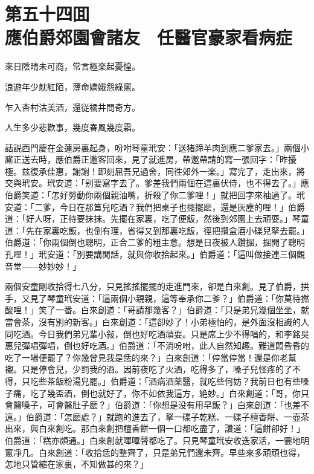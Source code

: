 
\chapter*{第五十四囬　\\應伯爵郊園會諸友　任醫官豪家看病症}


\begin{myquote}
來日陰晴未可商，常言極楽起憂惶。

浪遊年少躭紅陌，薄命嬌娥怨綠窻。

乍入杏村沽美酒，還従橘井問奇方。

人生多少悲歡事，幾度春風幾度霜。
\end{myquote}

話説西門慶在金蓮房裏起身，吩咐琴童玳安：「送猪蹄羊肉到應二爹家去。」兩個小廝正送去時，應伯爵正邀客回來，見了就進房，帶邀帶請的寫一張回字：「昨擾極。兹復承佳惠，謝謝！即刻屈吾兄過舍，同徃郊外一楽。」寫完了，走出來，將交與玳安。玳安道：「别要寫字去了。爹差我們兩個在這裏伏侍，也不得去了。」應伯爵笑道：「怎好勞動你兩個親油嘴，折殺了你二爹哩！」就把回字來袖過了。玳安道：「二爹，今日在那笪兒吃酒？我們把桌子也擺擺麽，還是灰塵的哩！」伯爵道：「好人呀，正待要抹抹。先擺在家裏，吃了便飯，然後到郊園上去頑耍。」琴童道：「先在家裏吃飯，也倒有理，省得又到那裏吃飯，徑把攢盒酒小碟兒拏去罷。」伯爵道：「你兩個倒也聰明，正合二爹的粗主意。想是日夜被人鑽掘，掘開了聰明孔哩！」玳安道：「別要講閒話，就與你收拾起來。」伯爵道：「這叫做接連三個觀音堂——妙妙妙！」

兩個安童剛收拾得七八分，只見搖搖擺擺的走進門來，卻是白來創。見了伯爵，拱手，又見了琴童玳安道：「這兩個小親親，這等奉承你二爹？」伯爵道：「你莫待撚酸哩！」笑了一番。白來創道：「哥請那幾客？」伯爵道：「只是弟兄幾個坐坐，就當會茶，沒有別的新客。」白來創道：「這卻妙了！小弟極怕的，是外面沒相識的人同吃酒。今日我們弟兄輩小敍，倒也好吃酒頑耍。只是席上少不得唱的，和李銘吳惠兒彈唱彈唱，倒也好吃酒。」伯爵道：「不消吩咐，此人自然知趣。難道悶昏昏的吃了一場便罷了？你幾曾見我是恁的來？」白來創道：「停當停當！還是你老幫襯。只是停會兒，少罰我的酒。因前夜吃了火酒，吃得多了，嗓子兒怪疼的了不得，只吃些茶飯粉湯兒罷。」伯爵道：「酒病酒薬醫，就吃些何妨？我前日也有些嗓子痛，吃了幾盃酒，倒也就好了，你不如依我這方，絶妙。」白來創道：「哥，你只會醫嗓子，可會醫肚子麽？」伯爵道：「你想是没有用早飯？」白來創道：「也差不遠。」伯爵道：「怎麽處？」就跑的進去了，拏一碟子乾糕、一碟子檀香餅、一壺茶出來，與白來創吃。那白來創把檀香餅一個一口都吃盡了，讚道：「這餅卻好！」伯爵道：「糕亦頗通。」白來創就嗶嗶聲都吃了。只見琴童玳安收迭家活，一霎地明窻凈几。白來創道：「收拾恁的整齊了，只是弟兄們還未齊。早些來多頑頑也得，怎地只管縮在家裏，不知做甚的來？」

